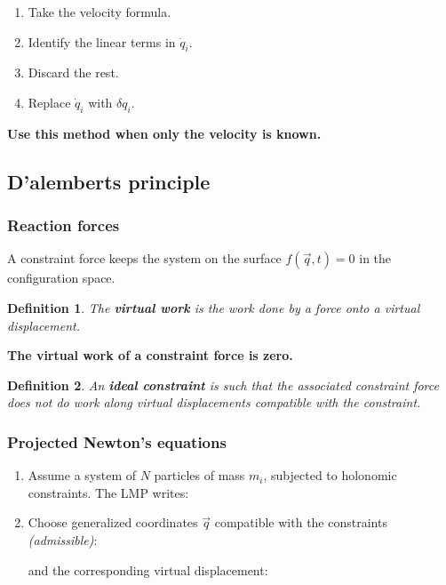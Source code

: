 \documentclass[10pt,a4paper]{scrartcl}
\newtheorem{define}{Definition}
\begin{document}
\begin{multicols*}{2}
\begin{enumerate}
\item Take the velocity formula.
\item Identify the linear terms in $\dot{q}_i$.
\item Discard the rest.
\item Replace $\dot{q}_i$ with $\delta q_i$.
\end{enumerate}

\textbf{Use this method when only the velocity is known.}

\subsection{D'alemberts principle}
\subsubsection{Reaction forces}
A constraint force keeps the system on the surface $f(\vec{q},t)=0$ in the configuration space.


\begin{define}
The \textbf{virtual work} is the work done by a force onto a virtual displacement.
\end{define}

\textbf{The virtual work of a constraint force is zero.}

\begin{define}
An \textbf{ideal constraint} is such that the associated constraint force does not do work along virtual displacements compatible with the constraint.
\end{define}
\subsubsection{Projected Newton's equations}
\begin{enumerate}
\item Assume a system of $N$ particles of mass $m_i$, subjected to holonomic constraints. The LMP writes:


\item Choose generalized coordinates $\vec{q}$ compatible with the constraints \emph{(admissible)}:


and the corresponding virtual displacement:


\end{enumerate}
\end{multicols*}
\end{document}
